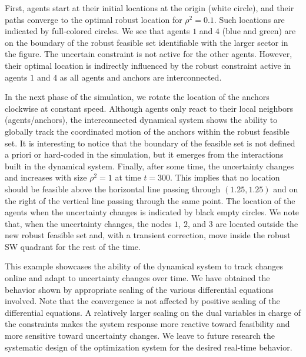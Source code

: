 \documentclass[journal,twoside,web]{ieeecolor}
\begin{document}
First, agents start at their initial locations at the origin (white circle), and their paths converge to the optimal robust location for $\rho^2=0.1$. Such locations are indicated by full-colored circles. We see that agents $1$ and $4$ (blue and green) are on the boundary of the robust feasible set identifiable with the larger sector in the figure. The uncertain constraint is not active for the other agents. However, their optimal location is indirectly influenced by the robust constraint active in agents $1$ and $4$ as all agents and anchors are interconnected.

In the next phase of the simulation, we rotate the location of the anchors clockwise at constant speed. Although agents only react to their local neighbors (agents/anchors), the interconnected dynamical system shows the ability to globally track the coordinated motion of the anchors within the robust feasible set. It is interesting to notice that the boundary of the feasible set is not defined a priori or hard-coded in the simulation, but it emerges from the interactions built in the dynamical system. Finally, after some time, the uncertainty changes and increases with size $\rho^2=1$ at time $t=300$. This implies that no location should be feasible above the horizontal line passing through $(1.25,1.25)$ and on the right of the vertical line passing through the same point. The location of the agents when the uncertainty changes is indicated by black empty circles. We note that, when the uncertainty changes, the nodes $1$, $2$, and $3$ are located outside the new robust feasible set and, with a transient correction, move inside the robust SW quadrant for the rest of the time.

This example showcases the ability of the dynamical system to track changes online and adapt to uncertainty changes over time. We have obtained the behavior shown by appropriate scaling of the various differential equations involved. Note that the convergence is not affected by positive scaling of the differential equations. A relatively larger scaling on the dual variables in charge of the constraints makes the system response more reactive toward feasibility and more sensitive toward uncertainty changes. We leave to future research the systematic design of the optimization system for the desired real-time behavior.
\end{document}
